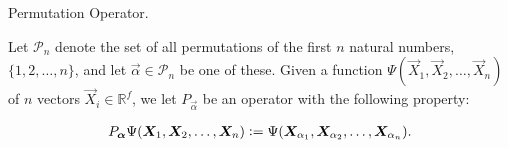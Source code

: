 \documentclass[Thesis.tex]{subfiles}
\begin{document}
\begin{definition}{Permutation Operator.}

     Let $\mathcal{P}_n$ denote the set of all permutations of the first $n$
     natural numbers, $\{1, 2, \dots, n\}$, and let $\vec\alpha\in \mathcal{P}_n$
     be one of these. Given a function $\Psi(\vec X_1, \vec X_2,\dots,\vec X_n)$ of
     $n$ vectors $\vec X_i\in \mathbb{R}^f$, we let $P_{\vec\alpha}$ be an
     operator with the following property:

    \begin{align}
        P_{\bm{\alpha}}\Psi(\bm{X}_1,\bm{X}_2,\dots,\bm{X}_n)
        \vcentcolon=
        \Psi(\bm{X}_{\alpha_1},\bm{X}_{\alpha_2},\dots,\bm{X}_{\alpha_n}).
    \end{align}
\end{definition}
\end{document}
